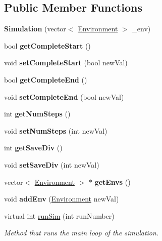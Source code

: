 \subsection*{Public Member Functions}
\begin{DoxyCompactItemize}
\item 
\hypertarget{classSimulation_ae902fd16a0f0c24d3b49c96cead9fcf9}{}\label{classSimulation_ae902fd16a0f0c24d3b49c96cead9fcf9} 
{\bfseries Simulation} (vector$<$ \hyperlink{classEnvironment}{Environment} $>$ \+\_\+env)
\item 
\hypertarget{classSimulation_a44dc929698224fbf195b9d9936fae82a}{}\label{classSimulation_a44dc929698224fbf195b9d9936fae82a} 
bool {\bfseries get\+Complete\+Start} ()
\item 
\hypertarget{classSimulation_adca9200350aad6630085d6f50ef910f3}{}\label{classSimulation_adca9200350aad6630085d6f50ef910f3} 
void {\bfseries set\+Complete\+Start} (bool new\+Val)
\item 
\hypertarget{classSimulation_a31e406c0ad5849a8e6496393ccbb3483}{}\label{classSimulation_a31e406c0ad5849a8e6496393ccbb3483} 
bool {\bfseries get\+Complete\+End} ()
\item 
\hypertarget{classSimulation_a0e8a32be7804eca80992fa6d1d27b0be}{}\label{classSimulation_a0e8a32be7804eca80992fa6d1d27b0be} 
void {\bfseries set\+Complete\+End} (bool new\+Val)
\item 
\hypertarget{classSimulation_a0cf743fa59385016d9e699fb0093317c}{}\label{classSimulation_a0cf743fa59385016d9e699fb0093317c} 
int {\bfseries get\+Num\+Steps} ()
\item 
\hypertarget{classSimulation_a68c66b40439322e4bda57eaa11386ce6}{}\label{classSimulation_a68c66b40439322e4bda57eaa11386ce6} 
void {\bfseries set\+Num\+Steps} (int new\+Val)
\item 
\hypertarget{classSimulation_a57f25582cd263d9739e9d72e75832a67}{}\label{classSimulation_a57f25582cd263d9739e9d72e75832a67} 
int {\bfseries get\+Save\+Div} ()
\item 
\hypertarget{classSimulation_a5346ad2601beff7e3918e25dd667ab4b}{}\label{classSimulation_a5346ad2601beff7e3918e25dd667ab4b} 
void {\bfseries set\+Save\+Div} (int new\+Val)
\item 
\hypertarget{classSimulation_a0110a1fad0e2390ea90fa387fe09cbdc}{}\label{classSimulation_a0110a1fad0e2390ea90fa387fe09cbdc} 
vector$<$ \hyperlink{classEnvironment}{Environment} $>$ $\ast$ {\bfseries get\+Envs} ()
\item 
\hypertarget{classSimulation_a8223c6354f021efcb667815fbd0682c0}{}\label{classSimulation_a8223c6354f021efcb667815fbd0682c0} 
void {\bfseries add\+Env} (\hyperlink{classEnvironment}{Environment} new\+Val)
\item 
virtual int \hyperlink{classSimulation_a7eb16da89581b496d33b77efbb63b9cd}{run\+Sim} (int run\+Number)
\begin{DoxyCompactList}\small\item\em Method that runs the main loop of the simulation. \end{DoxyCompactList}\end{DoxyCompactItemize}
